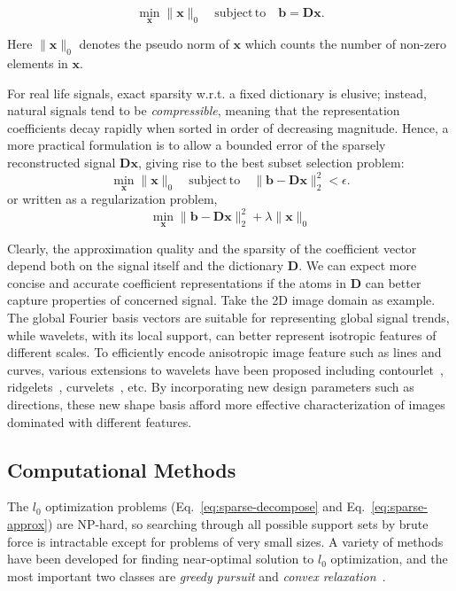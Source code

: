 \begin{equation}
\label{eq:sparse-decompose}
\min_\mathbf{x} \|\mathbf{x}\|_0 \quad \mathrm{subject\,to} \quad \mathbf{b}=\mathbf{D}\mathbf{x}.
\end{equation}

Here $\|\mathbf{x}\|_0$ denotes the pseudo norm of $\mathbf{x}$ which counts the number
of non-zero elements in $\mathbf{x}$.

For real life signals, exact sparsity w.r.t. a fixed dictionary is elusive; instead, natural
signals tend to be \emph{compressible}, meaning that the representation coefficients decay rapidly
when sorted in order of decreasing magnitude. Hence, a more practical formulation is to allow a bounded
error of the sparsely reconstructed signal $\mathbf{D}\mathbf{x}$, giving rise to the best
subset selection problem:
\begin{equation}
\label{eq:sparse-approx}
\min_\mathbf{x} \|\mathbf{x}\|_0 \quad \mathrm{subject\,to} \quad \|\mathbf{b}-\mathbf{D}\mathbf{x}\|_2^2<\epsilon.
\end{equation}
or written as a regularization problem,
\begin{equation}
\label{eq:regularized-sparse-approx}
\min_\mathbf{x}  \|\mathbf{b}-\mathbf{D}\mathbf{x}\|_2^2 + \lambda \|\mathbf{x}\|_0
\end{equation}

Clearly, the approximation quality and the sparsity of the coefficient vector depend both on the signal itself
and the dictionary $\mathbf{D}$. We can expect more concise and accurate coefficient representations if the atoms
in $\mathbf{D}$ can better capture properties of concerned signal. Take the 2D image domain as example. The global
Fourier basis vectors are suitable for representing global signal trends, while wavelets, with its local support,
can better represent isotropic features of different scales. To efficiently encode anisotropic image feature
such as lines and curves, various extensions to wavelets have been proposed
including contourlet~\cite{Do2005}, ridgelets~\cite{Emmanuel1999}, curvelets~\cite{Candes1999}, etc. By incorporating
new design parameters such as directions, these new shape basis afford more effective characterization of images
dominated with different features.

\subsection{Computational Methods}
The $l_0$ optimization problems (Eq.~\ref{eq:sparse-decompose} and Eq.~\ref{eq:sparse-approx}) are NP-hard,
so searching through all possible support sets by brute force is intractable except for problems of very small
sizes. A variety of methods have been developed for finding near-optimal solution to $l_0$ optimization, and
the most important two classes are \emph{greedy pursuit} and \emph{convex relaxation}~\cite{Tropp2010}.

